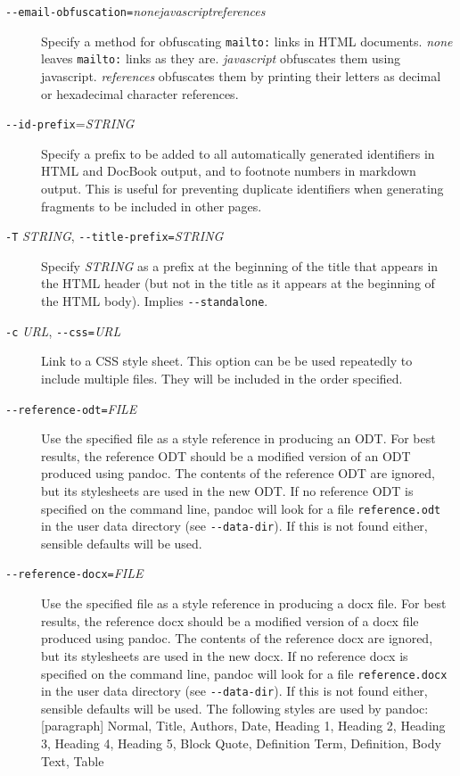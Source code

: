 \documentclass[]{article}
\begin{document}
\begin{description}
\item[\texttt{-{}-email-obfuscation=}\emph{none\textbar{}javascript\textbar{}references}]
Specify a method for obfuscating \texttt{mailto:} links in HTML
documents. \emph{none} leaves \texttt{mailto:} links as they are.
\emph{javascript} obfuscates them using javascript. \emph{references}
obfuscates them by printing their letters as decimal or hexadecimal
character references.
\item[\texttt{-{}-id-prefix}=\emph{STRING}]
Specify a prefix to be added to all automatically generated identifiers
in HTML and DocBook output, and to footnote numbers in markdown output.
This is useful for preventing duplicate identifiers when generating
fragments to be included in other pages.
\item[\texttt{-T} \emph{STRING},
\texttt{-{}-title-prefix=}\emph{STRING}]
Specify \emph{STRING} as a prefix at the beginning of the title that
appears in the HTML header (but not in the title as it appears at the
beginning of the HTML body). Implies \texttt{-{}-standalone}.
\item[\texttt{-c} \emph{URL}, \texttt{-{}-css=}\emph{URL}]
Link to a CSS style sheet. This option can be be used repeatedly to
include multiple files. They will be included in the order specified.
\item[\texttt{-{}-reference-odt=}\emph{FILE}]
Use the specified file as a style reference in producing an ODT. For
best results, the reference ODT should be a modified version of an ODT
produced using pandoc. The contents of the reference ODT are ignored,
but its stylesheets are used in the new ODT. If no reference ODT is
specified on the command line, pandoc will look for a file
\texttt{reference.odt} in the user data directory (see
\texttt{-{}-data-dir}). If this is not found either, sensible defaults
will be used.
\item[\texttt{-{}-reference-docx=}\emph{FILE}]
Use the specified file as a style reference in producing a docx file.
For best results, the reference docx should be a modified version of a
docx file produced using pandoc. The contents of the reference docx are
ignored, but its stylesheets are used in the new docx. If no reference
docx is specified on the command line, pandoc will look for a file
\texttt{reference.docx} in the user data directory (see
\texttt{-{}-data-dir}). If this is not found either, sensible defaults
will be used. The following styles are used by pandoc: {[}paragraph{]}
Normal, Title, Authors, Date, Heading 1, Heading 2, Heading 3, Heading
4, Heading 5, Block Quote, Definition Term, Definition, Body Text, Table

\end{description}
\end{document}
